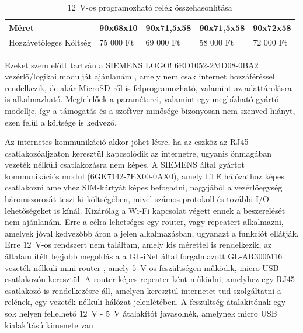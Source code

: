 \begin{table}[]
{\begin{tabular}{|l||l|l|l|l|}
			Méret                & 90x68x10                                                                 & 90x71,5x58                                                  & 90x71,5x58                                                             & 90x72x58                                                                              \\ \hline
			Hozzávetőleges Költség & 75 000 Ft                                        & 69 000 Ft                & 58 000 Ft                                                     & 72 000 Ft\\ \hline
		\end{tabular}
	}
	\caption{$12$~V-os programozható relék összehasonlítása}
	\label{prog_rele}
	\renewcommand{\arraystretch}{1}
\end{table}

Ezeket szem előtt tartván a SIEMENS LOGO! 6ED1052-2MD08-0BA2 vezérlő/logikai modulját ajánlanám \cite{siemens_logo_adatlap}, amely nem csak internet hozzáféréssel rendelkezik, de akár MicroSD-ről is felprogramozható, valamint az adattárolásra is alkalmazható. Megfelelőek a paraméterei, valamint egy megbízható gyártó modellje, így a támogatás és a szoftver minősége bizonyosan nem szenved hiányt, ezen felül a költsége is kedvező.

Az internetes kommunikáció akkor jöhet létre, ha az eszköz az RJ45 csatlakozóaljzaton keresztül kapcsolódik az internetre, ugyanis önmagában vezeték nélküli csatlakozásra nem képes. A SIEMENS által gyártot kommunikációs modul (6GK7142-7EX00-0AX0), amely LTE hálózathoz képes csatlakozni amelyhez SIM-kártyát képes befogadni, nagyjából a vezérlőegység háromszorosát teszi ki költségében, mivel számos protokoll és további I/O lehetőségeket is kínál. Kizárólag a Wi-Fi kapcsolat végett ennek a beszerelését nem ajánlanám. Erre a célra lehetséges egy router, vagy repeatert alkalmazni, amelyek jóval kedvezőbb áron a jelen alkalmazásban, ugyanazt a funkciót ellátják. Erre $12$~V-os rendszert nem találtam, amely kis mérettel is rendelkezik, az általam ítélt legjobb megoldás a a GL-iNet által forgalmazott GL-AR300M16 vezeték nélküli mini router \cite{router}, amely $5$~V-os feszültségen működik, micro USB csatlakozón keresztül. A router képes repeater-ként működni, amelyhez egy RJ45 csatlakozó is rendelkezésre áll, amelyen keresztül internetet tud szolgáltatni a relének, egy vezeték nélküli hálózat jelenlétében. A feszültség átalakítónak egy sok helyen fellelhető $12$~V - $5$~V átalakítót javasolnék, amelynek micro USB kialakítású kimenete van \cite{fesz_atalak}.
